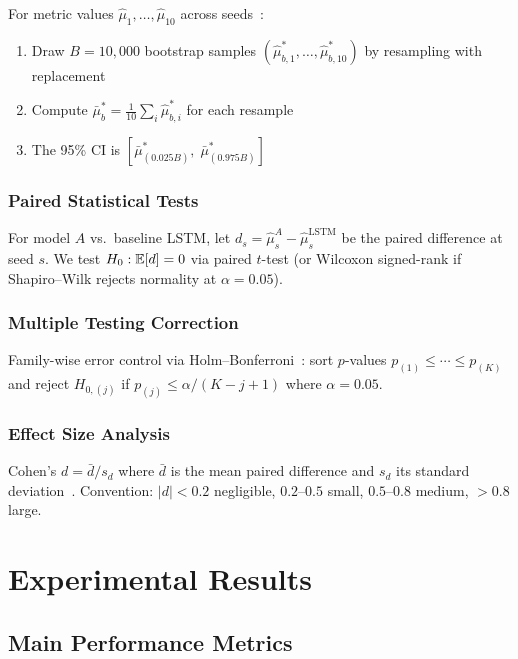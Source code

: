 For metric values $\hat\mu_1, \ldots, \hat\mu_{10}$ across seeds~\citep{efron1979bootstrap}:
\begin{enumerate}[noitemsep]
    \item Draw $B = 10{,}000$ bootstrap samples $(\hat\mu^*_{b,1}, \ldots, \hat\mu^*_{b,10})$ by resampling with replacement
    \item Compute $\bar\mu^*_b = \frac{1}{10}\sum_i \hat\mu^*_{b,i}$ for each resample
    \item The 95\% CI is $[\bar\mu^*_{(0.025B)},\; \bar\mu^*_{(0.975B)}]$
\end{enumerate}

\subsubsection{Paired Statistical Tests}

For model $A$ vs.\ baseline LSTM, let $d_s = \hat\mu_s^A - \hat\mu_s^{\mathrm{LSTM}}$ be the paired difference at seed $s$. We test $H_0: \mathbb{E}[d] = 0$ via paired $t$-test (or Wilcoxon signed-rank if Shapiro--Wilk rejects normality at $\alpha = 0.05$).

\subsubsection{Multiple Testing Correction}

Family-wise error control via Holm--Bonferroni~\citep{holm1979simple}: sort $p$-values $p_{(1)} \le \cdots \le p_{(K)}$ and reject $H_{0,(j)}$ if $p_{(j)} \le \alpha/(K - j + 1)$ where $\alpha = 0.05$.

\subsubsection{Effect Size Analysis}

Cohen's $d = \bar{d} / s_d$ where $\bar{d}$ is the mean paired difference and $s_d$ its standard deviation~\citep{cohen1988statistical}. Convention: $|d| < 0.2$ negligible, $0.2$--$0.5$ small, $0.5$--$0.8$ medium, $> 0.8$ large.

\section{Experimental Results}
\label{sec:results}

\subsection{Main Performance Metrics}

